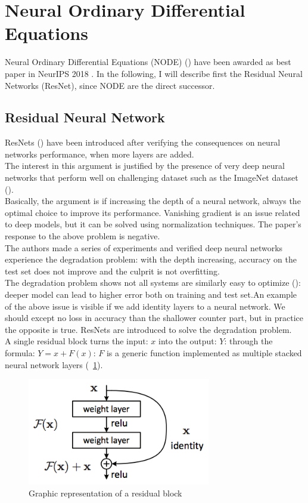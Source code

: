 \documentclass[LaM,binding=0.6cm]{sapthesis}
\begin{document}
\section{Neural Ordinary Differential Equations}
Neural Ordinary Differential Equations (NODE) (\cite{DBLP:journals/corr/abs-1806-07366}) have been awarded as best paper in NeurIPS 2018 . In the following, I will describe first the Residual Neural Networks (ResNet), since NODE are the direct successor.
\subsection{Residual Neural Network}
ResNets (\cite{DBLP:journals/corr/HeZRS15}) have been introduced after verifying the consequences on neural networks performance, when more layers are added.\\The interest in this argument is justified by the presence of very deep neural networks that perform well on challenging dataset such as the ImageNet dataset (\cite{Simonyan14verydeep}).\\Basically, the argument is if increasing the depth of a neural network, always the optimal choice to improve its performance. Vanishing gradient is an issue related to deep models, but it can be solved using normalization techniques. The paper's response to the above problem is negative.\\The authors made a series of experiments and verified deep neural networks experience the degradation problem: with the depth increasing, accuracy on the test set does not improve and the culprit is not overfitting.\\The degradation problem shows not all systems are similarly easy to optimize (\cite{DBLP:journals/corr/HeZRS15}): deeper model can lead to higher error both on training and test set.An example of the above issue is visible if we add identity layers to a neural network. We should except no loss in accuracy than the shallower counter part, but in practice the opposite is true. ResNets are introduced to solve the degradation problem.\\A single residual block turns the input: $x$ into the output: $Y$: through the formula: $Y = x +F(x)$: $F$ is a generic function implemented as multiple stacked neural network layers (~\ref{fig:resnetfunc}).
\begin{figure}[H]  \centering
	\includegraphics[width=80mm,scale=0.7]{resnetfun.png}
	\caption{Graphic representation of a residual block}
	\label{fig:resnetfunc}
\end{figure}
\end{document}
